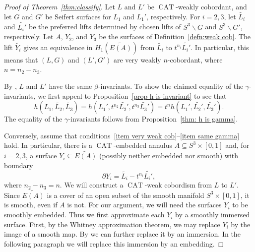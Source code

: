 \documentclass[a4paper, 11pt]{amsart}
\newcommand{\CAT}{\operatorname{CAT}}
\theoremstyle{definition}
\newcommand{\noteta}{h}
\begin{document}
\begin{proof}[Proof of Theorem~\ref{thm:classify}]
Let $L$ and $L'$ be $\CAT$-weakly cobordant, and let $G$ and $G'$ be Seifert surfaces for $L_1$ and $L_1'$, respectively. For $i=2,3$, let $\widetilde{L_i}$ and $\widetilde{L_i'}$ be the preferred lifts determined by chosen lifts of $S^3\smallsetminus G$ and $S^3\smallsetminus G'$, respectively. Let $A$, $Y_2$, and $Y_3$ be the surfaces of Definition~\ref{defn:weak cob}. The lift $\widetilde{Y_i}$ gives an equivalence in $H_1(\widetilde{E(A)})$ from $\widetilde{L_i}$ to $t^{n_i}\widetilde{L_i'}$. In particular, this means that $(L,G)$ and $(L',G')$ are very weakly $n$-cobordant, where $n=n_2-n_3$.

By \cite[Corollary~5.2]{C2}, $L$ and $L'$ have the same $\beta$-invariants. To show the claimed equality of the $\gamma$-invariants, we first appeal to Proposition~\ref{prop h is invariant} to see that
\[
\noteta(L_1,\widetilde{L_2},\widetilde{L_3})
=
\noteta(L_1',t^{n_2}\widetilde{L_2'},t^{n_3}\widetilde{L_3'})
=
t^n\noteta(L_1',\widetilde{L_2'},\widetilde{L_3'}).
\]
The equality of the $\gamma$-invariants follows from Proposition~\ref{thm: h is gamma}.



Conversely, assume that conditions~\eqref{item very weak cob}--\eqref{item same gamma} hold. In particular, there is a $\CAT$-embedded annulus
$A\subseteq S^3\times[0,1]$ and, for $i=2,3$, a surface
$Y_i \subseteq \widetilde{E(A)}$ (possibly neither embedded nor smooth) with boundary
\[
\partial Y_i=\widetilde{L_i}-t^{n_i}\widetilde{L_i'},
\]
where $n_2-n_3=n$. We will construct a $\CAT$-weak cobordism from $L$ to $L'$. Since $\widetilde{E(A)}$ is a cover of an open subset of the smooth manifold $S^3\times[0,1]$, it is smooth, even if $A$ is not. For our argument, we will need the surfaces $Y_i$ to be smoothly embedded. Thus we first approximate each $Y_i$ by a smoothly immersed surface.  First, by the Whitney approximation theorem, \cite[Theorem~10.21]{LeeSmoothManifolds} we may replace $Y_i$ by the image of a smooth map.   By \cite[Theorem~2.8]{AdachiEmbeddingsAndImmersions} we can further replace it by an immersion.  In the following paragraph we will replace this immersion by an embedding.


\end{proof}
\end{document}
